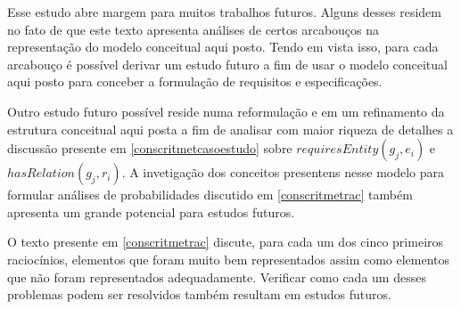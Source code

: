 Esse estudo abre margem para muitos trabalhos futuros. Alguns desses residem no fato de que este texto apresenta análises de certos arcabouços na representação do modelo conceitual aqui posto. Tendo em vista isso, para cada arcabouço é possível derivar um estudo futuro a fim de usar o modelo conceitual aqui posto para conceber a formulação de requisitos e especificações. 

Outro estudo futuro possível reside numa reformulação e em um refinamento da estrutura conceitual aqui posta a fim de analisar com maior riqueza de detalhes a discussão presente em \ref{conscritmetcasoestudo} sobre $requiresEntity(g_j,e_i)$ e $hasRelation(g_j,r_i)$. A invetigação dos conceitos presentens nesse modelo para formular análises de probabilidades discutido em \ref{conscritmetrac} também apresenta um grande potencial para estudos futuros.

O texto presente em \ref{conscritmetrac} discute, para cada um dos cinco primeiros raciocínios, elementos que foram muito bem representados assim como elementos que não foram representados adequadamente. Verificar como cada um desses problemas podem ser resolvidos também resultam em estudos futuros. 